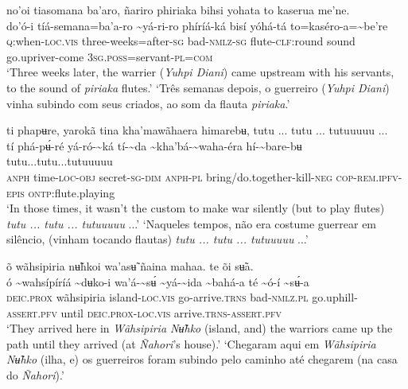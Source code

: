 \documentclass[output=paper,
modfonts,nonflat
]{langsci/langscibook}
\begin{document}
\newpage 
\ea no'oi tiasomana ba'aro, ñariro phiriaka bihsi yohata to kaserua me'ne.\\[.3em]
\gll {\textasciitilde}do'ó-i	tíá-semana=ba'a-ro {\textasciitilde}yá-ri-ro	phíríá-ká{\footnotemark} 	bisí	yóhá-tá	to=kaséro-a={\textasciitilde}be're\\
     \textsc{q:}when-\textsc{loc.vis}	three-weeks=after\textsc{-sg} bad\textsc{-nmlz-sg}	flute-\textsc{clf:}round	sound	go.upriver-come	3\textsc{sg.poss}=servant-\textsc{pl=com}\\
\glt ‘Three weeks later, the warrier (\textit{Yuhpi Diani}) came upstream with his servants, to the sound of \textit{piriaka} flutes.’
\glt ‘Três semanas depois, o guerreiro (\textit{Yuhpi Diani}) vinha subindo com seus criados, ao som da flauta \textit{piriaka}.’ 
\z 

 
\ea ti phapʉre, yarokã tina kha'mawãhaera himarebʉ, tutu ... tutu ... tutuuuuu ...\\[.3em]
\gll tí	phá-pʉ́-ré	yá-ró-{\textasciitilde}ká	tí-{\textasciitilde}da	{\textasciitilde}kha'bá-{\textasciitilde}waha-éra	hí-{\textasciitilde}bare-bʉ	tutu...tutu...tutuuuuu\\
     \textsc{anph}	time\textsc{-loc-obj}	secret\textsc{-sg-dim}	\textsc{anph-pl}	bring/do.together{\footnotemark}-kill\textsc{-neg}	\textsc{cop-rem.ipfv-epis}	\textsc{ontp:}flute.playing\\
\glt ‘In those times, it wasn't the custom to make war silently (but to play flutes) \textit{tutu ... tutu ... tutuuuuu} ...’
\glt ‘Naqueles tempos, não era costume guerrear em silêncio, (vinham tocando flautas) \textit{tutu ... tutu ... tutuuuuu} ...’
\z 

\ea õ wãhsipiria nʉ̃hkoi wa'asʉ̃ ñaina mahaa. te õi sʉ̃a.\\[.3em]
\gll {\textasciitilde}ó	{\textasciitilde}wahsípíríá	{\textasciitilde}dʉko-i	wa'á-{\textasciitilde}sʉ́	{\textasciitilde}yá-{\textasciitilde}ida	{\textasciitilde}bahá-a té	{\textasciitilde}ó-í	{\textasciitilde}sʉ́-a\\
     \textsc{deic.prox}	wãhsipiria	island-\textsc{loc.vis}	go-arrive.\textsc{trns}	bad-\textsc{nmlz.pl}	go.uphill-\textsc{assert.pfv} until	\textsc{deic.prox-loc.vis}	arrive.\textsc{trns}-\textsc{assert.pfv}\\
\glt ‘They arrived here in \textit{Wãhsipiria Nʉ̃hko} (island, and) the warriors came up the path until they arrived (at \textit{Ñahori}'s house).’
\glt ‘Chegaram aqui em \textit{Wãhsipiria Nʉ̃hko} (ilha, e) os guerreiros foram subindo pelo caminho até chegarem (na casa do \textit{Ñahori}).’
\z 
\end{document}
